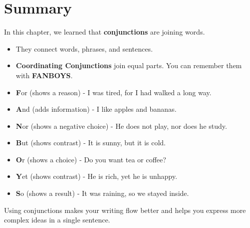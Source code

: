 \section{Summary}
\begin{summarybox}
In this chapter, we learned that \textbf{conjunctions} are joining words.
\begin{itemize}
    \item They connect words, phrases, and sentences.
    \item \textbf{Coordinating Conjunctions} join equal parts. You can remember them with \textbf{FANBOYS}.
    \item \textbf{F}or (shows a reason) - I was tired, for I had walked a long way.
    \item \textbf{A}nd (adds information) - I like apples and bananas.
    \item \textbf{N}or (shows a negative choice) - He does not play, nor does he study.
    \item \textbf{B}ut (shows contrast) - It is sunny, but it is cold.
    \item \textbf{O}r (shows a choice) - Do you want tea or coffee?
    \item \textbf{Y}et (shows contrast) - He is rich, yet he is unhappy.
    \item \textbf{S}o (shows a result) - It was raining, so we stayed inside.
\end{itemize}
Using conjunctions makes your writing flow better and helps you express more complex ideas in a single sentence.
\end{summarybox}